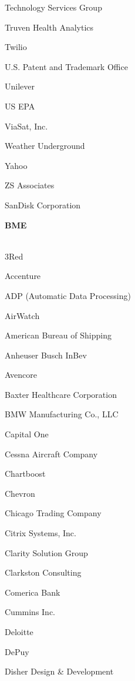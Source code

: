 \documentclass[twoside]{article}
\begin{document}
\begin{center}
\begin{multicols}{5}
\begin{FlushLeft}
\begin{compactitem}
\item Technology Services Group
\item Truven Health Analytics
\item Twilio
\item U.S. Patent and Trademark Office
\item Unilever
\item US EPA
\item ViaSat, Inc.
\item Weather Underground
\item Yahoo
\item ZS Associates
\item SanDisk Corporation
\end{compactitem}
        \end{FlushLeft}
        \vspace{1em}
        {\fontsize{14}{16}\selectfont \bf BME}\\
        \vspace{-1em}
        ~\hrulefill~
        \vspace{-.9em}
        \begin{FlushLeft}
        \begin{compactitem}
        \item 3Red
\item Accenture
\item ADP (Automatic Data Processing)
\item AirWatch
\item American Bureau of Shipping
\item Anheuser Busch InBev
\item Avencore
\item Baxter Healthcare Corporation
\item BMW Manufacturing Co., LLC
\item Capital One
\item Cessna Aircraft Company
\item Chartboost
\item Chevron
\item Chicago Trading Company
\item Citrix Systems, Inc.
\item Clarity Solution Group
\item Clarkston Consulting
\item Comerica Bank
\item Cummins Inc.
\item Deloitte
\item DePuy
\item Disher Design \& Development

\end{compactitem}
\end{FlushLeft}
\end{multicols}
\end{center}
\end{document}
